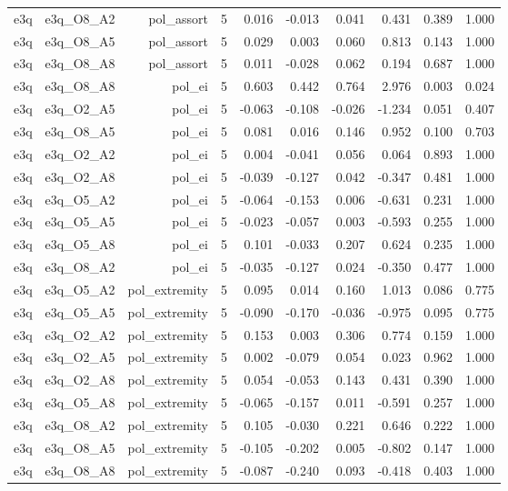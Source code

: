 \documentclass[11pt]{article}
\begin{document}
\begin{landscape}
\begin{longtable}{@{}lrrrrrrrrr@{}}
e3q & e3q\_O8\_A2 & pol\_assort & 5 & 0.016 & -0.013 & 0.041 & 0.431 & 0.389 & 1.000 \\
e3q & e3q\_O8\_A5 & pol\_assort & 5 & 0.029 & 0.003 & 0.060 & 0.813 & 0.143 & 1.000 \\
e3q & e3q\_O8\_A8 & pol\_assort & 5 & 0.011 & -0.028 & 0.062 & 0.194 & 0.687 & 1.000 \\
e3q & e3q\_O8\_A8 & pol\_ei & 5 & 0.603 & 0.442 & 0.764 & 2.976 & 0.003 & 0.024 \\
e3q & e3q\_O2\_A5 & pol\_ei & 5 & -0.063 & -0.108 & -0.026 & -1.234 & 0.051 & 0.407 \\
e3q & e3q\_O8\_A5 & pol\_ei & 5 & 0.081 & 0.016 & 0.146 & 0.952 & 0.100 & 0.703 \\
e3q & e3q\_O2\_A2 & pol\_ei & 5 & 0.004 & -0.041 & 0.056 & 0.064 & 0.893 & 1.000 \\
e3q & e3q\_O2\_A8 & pol\_ei & 5 & -0.039 & -0.127 & 0.042 & -0.347 & 0.481 & 1.000 \\
e3q & e3q\_O5\_A2 & pol\_ei & 5 & -0.064 & -0.153 & 0.006 & -0.631 & 0.231 & 1.000 \\
e3q & e3q\_O5\_A5 & pol\_ei & 5 & -0.023 & -0.057 & 0.003 & -0.593 & 0.255 & 1.000 \\
e3q & e3q\_O5\_A8 & pol\_ei & 5 & 0.101 & -0.033 & 0.207 & 0.624 & 0.235 & 1.000 \\
e3q & e3q\_O8\_A2 & pol\_ei & 5 & -0.035 & -0.127 & 0.024 & -0.350 & 0.477 & 1.000 \\
e3q & e3q\_O5\_A2 & pol\_extremity & 5 & 0.095 & 0.014 & 0.160 & 1.013 & 0.086 & 0.775 \\
e3q & e3q\_O5\_A5 & pol\_extremity & 5 & -0.090 & -0.170 & -0.036 & -0.975 & 0.095 & 0.775 \\
e3q & e3q\_O2\_A2 & pol\_extremity & 5 & 0.153 & 0.003 & 0.306 & 0.774 & 0.159 & 1.000 \\
e3q & e3q\_O2\_A5 & pol\_extremity & 5 & 0.002 & -0.079 & 0.054 & 0.023 & 0.962 & 1.000 \\
e3q & e3q\_O2\_A8 & pol\_extremity & 5 & 0.054 & -0.053 & 0.143 & 0.431 & 0.390 & 1.000 \\
e3q & e3q\_O5\_A8 & pol\_extremity & 5 & -0.065 & -0.157 & 0.011 & -0.591 & 0.257 & 1.000 \\
e3q & e3q\_O8\_A2 & pol\_extremity & 5 & 0.105 & -0.030 & 0.221 & 0.646 & 0.222 & 1.000 \\
e3q & e3q\_O8\_A5 & pol\_extremity & 5 & -0.105 & -0.202 & 0.005 & -0.802 & 0.147 & 1.000 \\
e3q & e3q\_O8\_A8 & pol\_extremity & 5 & -0.087 & -0.240 & 0.093 & -0.418 & 0.403 & 1.000 \\

\end{longtable}
\end{landscape}
\end{document}

